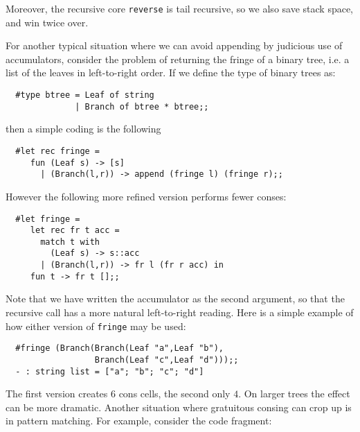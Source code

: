Moreover, the recursive core {\tt reverse} is tail recursive, so we also save
stack space, and win twice over.

For another typical situation where we can avoid appending by judicious use of
accumulators, consider the problem of returning the fringe of a binary tree,
i.e. a list of the leaves in left-to-right order. If we define the type of
binary trees as:

\begin{boxed}\begin{verbatim}
  #type btree = Leaf of string
              | Branch of btree * btree;;
\end{verbatim}\end{boxed}

\noindent then a simple coding is the following

\begin{boxed}\begin{verbatim}
  #let rec fringe =
     fun (Leaf s) -> [s]
       | (Branch(l,r)) -> append (fringe l) (fringe r);;
\end{verbatim}\end{boxed}

\noindent However the following more refined version performs fewer conses:

\begin{boxed}\begin{verbatim}
  #let fringe =
     let rec fr t acc =
       match t with
         (Leaf s) -> s::acc
       | (Branch(l,r)) -> fr l (fr r acc) in
     fun t -> fr t [];;
\end{verbatim}\end{boxed}

Note that we have written the accumulator as the second argument, so that the
recursive call has a more natural left-to-right reading. Here is a simple
example of how either version of {\tt fringe} may be used:

\begin{boxed}\begin{verbatim}
  #fringe (Branch(Branch(Leaf "a",Leaf "b"),
                  Branch(Leaf "c",Leaf "d")));;
  - : string list = ["a"; "b"; "c"; "d"]
\end{verbatim}\end{boxed}

The first version creates $6$ cons cells, the second only $4$. On larger trees
the effect can be more dramatic. Another situation where gratuitous consing can
crop up is in pattern matching. For example, consider the code fragment:

